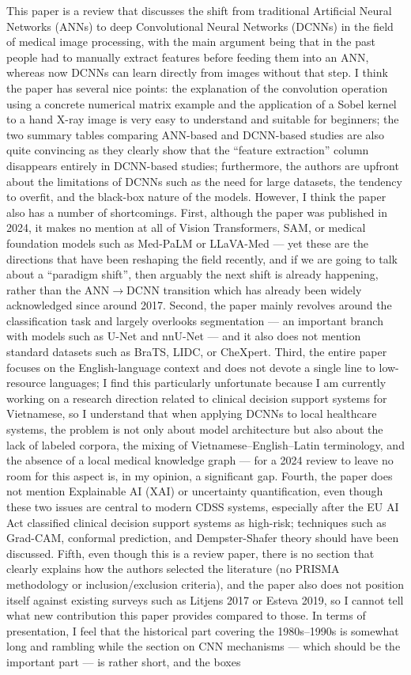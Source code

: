 \documentclass[12pt,a4paper]{article}
\begin{document}
This paper is a review that discusses the shift from traditional Artificial Neural Networks (ANNs) to deep Convolutional Neural Networks (DCNNs) in the field of medical image processing, with the main argument being that in the past people had to manually extract features before feeding them into an ANN, whereas now DCNNs can learn directly from images without that step. I think the paper has several nice points: the explanation of the convolution operation using a concrete numerical matrix example and the application of a Sobel kernel to a hand X-ray image is very easy to understand and suitable for beginners; the two summary tables comparing ANN-based and DCNN-based studies are also quite convincing as they clearly show that the ``feature extraction'' column disappears entirely in DCNN-based studies; furthermore, the authors are upfront about the limitations of DCNNs such as the need for large datasets, the tendency to overfit, and the black-box nature of the models. However, I think the paper also has a number of shortcomings. First, although the paper was published in 2024, it makes no mention at all of Vision Transformers, SAM, or medical foundation models such as Med-PaLM or LLaVA-Med --- yet these are the directions that have been reshaping the field recently, and if we are going to talk about a ``paradigm shift'', then arguably the next shift is already happening, rather than the ANN$\rightarrow$DCNN transition which has already been widely acknowledged since around 2017. Second, the paper mainly revolves around the classification task and largely overlooks segmentation --- an important branch with models such as U-Net and nnU-Net --- and it also does not mention standard datasets such as BraTS, LIDC, or CheXpert. Third, the entire paper focuses on the English-language context and does not devote a single line to low-resource languages; I find this particularly unfortunate because I am currently working on a research direction related to clinical decision support systems for Vietnamese, so I understand that when applying DCNNs to local healthcare systems, the problem is not only about model architecture but also about the lack of labeled corpora, the mixing of Vietnamese--English--Latin terminology, and the absence of a local medical knowledge graph --- for a 2024 review to leave no room for this aspect is, in my opinion, a significant gap. Fourth, the paper does not mention Explainable AI (XAI) or uncertainty quantification, even though these two issues are central to modern CDSS systems, especially after the EU AI Act classified clinical decision support systems as high-risk; techniques such as Grad-CAM, conformal prediction, and Dempster-Shafer theory should have been discussed. Fifth, even though this is a review paper, there is no section that clearly explains how the authors selected the literature (no PRISMA methodology or inclusion/exclusion criteria), and the paper also does not position itself against existing surveys such as Litjens 2017 or Esteva 2019, so I cannot tell what new contribution this paper provides compared to those. In terms of presentation, I feel that the historical part covering the 1980s--1990s is somewhat long and rambling while the section on CNN mechanisms --- which should be the important part --- is rather short, and the boxes 
\end{document}
